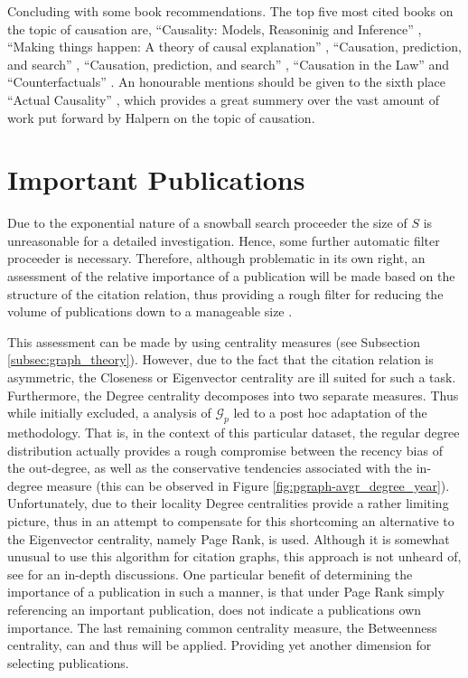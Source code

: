 \documentclass[11pt,a4paper]{book}
\theoremstyle{definition}
\theoremstyle{definition}
\theoremstyle{definition}
\theoremstyle{remark}
\newcommand{\pset}{S}
\newcommand{\pgraph}{\mathcal{G}_{p}}
\begin{document}
Concluding with some book recommendations. The top five most cited books on the topic of causation are, ``Causality: Models, Reasoninig and Inference'' \parencite{pearl2009causality}, ``Making things happen: A theory of causal explanation'' \parencite{woodward2005making},
``Causation, prediction, and search'' \parencite{spirtes2000causation}, ``Causation, prediction, and search'' \parencite{spirtes2000causation}, ``Causation in the Law'' \parencite{hart1985causation}  and ``Counterfactuals'' \parencite{lewis2013counterfactuals}. An honourable mentions should be given to the sixth place ``Actual Causality'' \parencite{halpern2016actual}, which provides a great summery over the vast amount of work put forward by Halpern
on the topic of causation.



\section{Important Publications}
\label{subsec:important_pubs}

Due to the exponential nature of a snowball search proceeder the size of $\pset$ is unreasonable for a detailed investigation. Hence, some further automatic filter proceeder is necessary.
Therefore, although problematic in its own right, an assessment of the relative importance of a publication will be made based on the 
structure of the citation relation, thus providing a rough filter for reducing the volume of publications down to a manageable size \parencite{meho2007rise,mingers2015review,leydesdorff2012scientometrics}. 

This assessment can be made by using centrality measures (see Subsection \ref{subsec:graph_theory}). 
However, due to the fact that the citation relation is asymmetric, the Closeness or Eigenvector centrality are ill suited for such a task.
Furthermore, the Degree centrality decomposes into two separate  measures. Thus while initially excluded, a analysis of $\pgraph$ led to a post hoc adaptation of the methodology. That is, in the context of this particular dataset, the regular degree distribution actually provides a rough compromise between the recency bias of the out-degree, as well as the conservative tendencies associated with the in-degree measure (this can be observed in Figure \ref{fig:pgraph-avgr_degree_year}). Unfortunately, due to their locality Degree centralities provide a rather limiting picture, thus in an attempt to compensate for this shortcoming an alternative to the Eigenvector centrality, namely Page Rank, is used. Although it is somewhat unusual to use this algorithm for citation graphs, this approach is not unheard of, see \parencite{ding2009pagerank,ma2008bringing,chen2007finding,maslov2008promise,nykl2014pagerank} for an in-depth discussions. One particular benefit of determining the importance of a publication in such a manner, is that under Page Rank simply referencing an important publication, does not indicate a publications own importance. The last remaining common centrality measure, the Betweenness centrality, can and thus will be applied. Providing yet another dimension for selecting publications. 
\end{document}
